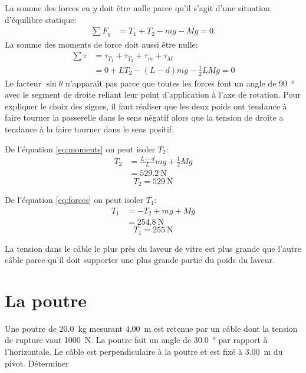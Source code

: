 \documentclass{tufte-handout}
\begin{document}
La somme des forces en $y$ doit être nulle parce qu'il s'agit d'une situation
d'équilibre statique:
\begin{align}
  \label{eq:forces}
  \sum F_y &= T_1 + T_2 - mg - Mg = 0.
\end{align}
La somme des moments de force doit aussi être nulle:
\begin{align}
  \label{eq:moments}
  \sum \tau &= \tau_{T_1} + \tau_{T_2} + \tau_{m} + \tau_{M} \nonumber \\
            &= 0 + LT_2 - (L - d)mg - \frac{1}{2} L Mg = 0
\end{align}
Le facteur $\sin\theta$ n'apparaît pas parce que toutes les forces font un
angle de \SI{90}{\degree} avec le segment de droite reliant leur point
d'application à l'axe de rotation.  Pour expliquer le choix des signes, il faut
réaliser que les deux poids ont tendance à faire tourner la passerelle dans le
sens négatif alors que la tension de droite a tendance à la faire tourner dans
le sens positif.

De l'équation \ref{eq:moments} on peut isoler $T_2$:
\begin{align*}
  T_2 &= \frac{L - d}{L} mg + \frac{1}{2}Mg \\
      &= \SI{529.2}{\newton}
\end{align*}
\begin{equation*}
  \boxed{T_2 = \SI{529}{\newton}}
\end{equation*}

De l'équation \ref{eq:forces} on peut isoler $T_1$:
\begin{align*}
  T_1 &= -T_2 + mg + Mg \\
      &= \SI{254.8}{\newton}
\end{align*}
\begin{equation*}
  \boxed{T_1 = \SI{255}{\newton}}
\end{equation*}

La tension dans le câble le plus près du laveur de vitre est plus grande que
l'autre câble parce qu'il doit supporter une plus grande partie du poids du
laveur.


\section{La poutre}

Une poutre de \SI{20.0}{kg} mesurant \SI{4.00}{m} est retenue par un câble dont
la tension de rupture vaut \SI{1000}{N}. La poutre fait un angle de
\SI{30.0}{\degree} par rapport à l'horizontale. Le câble est perpendiculaire à
la poutre et est fixé à \SI{3.00}{m} du pivot.  Déterminer
\end{document}
